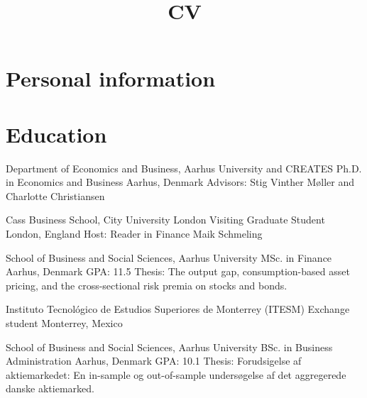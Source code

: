 \documentclass[11pt,a4paper,sans]{moderncv}
\title{CV}
\begin{document}
\makecvtitle


\section{Personal information}


\section{Education}

        {Department of Economics and Business, Aarhus University and CREATES}
        {Ph.D. in Economics and Business}
        {Aarhus, Denmark} 
        {}
        {Advisors: Stig Vinther Møller and Charlotte Christiansen}

        {Cass Business School, City University London}
        {Visiting Graduate Student}
        {London, England}
        {}
        {Host: Reader in Finance Maik Schmeling}

        {School of Business and Social Sciences, Aarhus University}
        {MSc. in Finance}
        {Aarhus, Denmark}
        {GPA: 11.5}
        {Thesis: The output gap, consumption-based asset pricing, and the cross-sectional risk premia on stocks and bonds.}

        {Instituto Tecnol{\'o}gico de Estudios Superiores de Monterrey (ITESM)}
        {Exchange student}
        {Monterrey, Mexico}
        {}
        {}

        {School of Business and Social Sciences, Aarhus University}
        {BSc. in Business Administration}
        {Aarhus, Denmark}
        {GPA: 10.1}
        {Thesis: Forudsigelse af aktiemarkedet: En in-sample og out-of-sample undersøgelse af det aggregerede danske aktiemarked.}
\end{document}
